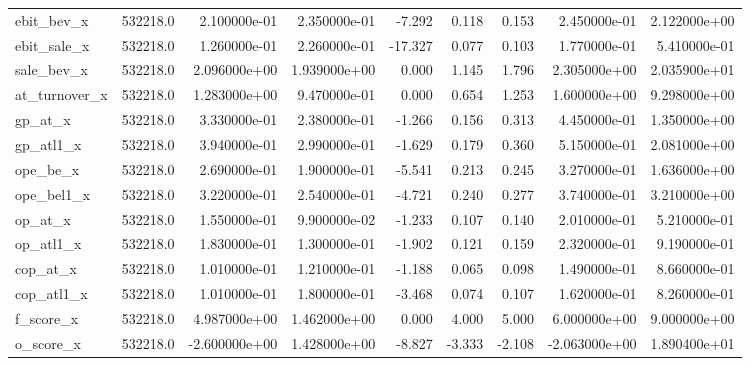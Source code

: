 \documentclass[12pt]{article}
\begin{document}
{\begin{landscape}
\begin{longtable}{|l|r|r|r|r|r|r|r|r|}
ebit\_bev\_x             &  532218.0 &  2.100000e-01 &  2.350000e-01 &      -7.292 &        0.118 &        0.153 &  2.450000e-01 &  2.122000e+00 \\
ebit\_sale\_x            &  532218.0 &  1.260000e-01 &  2.260000e-01 &     -17.327 &        0.077 &        0.103 &  1.770000e-01 &  5.410000e-01 \\
sale\_bev\_x             &  532218.0 &  2.096000e+00 &  1.939000e+00 &       0.000 &        1.145 &        1.796 &  2.305000e+00 &  2.035900e+01 \\
at\_turnover\_x          &  532218.0 &  1.283000e+00 &  9.470000e-01 &       0.000 &        0.654 &        1.253 &  1.600000e+00 &  9.298000e+00 \\
gp\_at\_x                &  532218.0 &  3.330000e-01 &  2.380000e-01 &      -1.266 &        0.156 &        0.313 &  4.450000e-01 &  1.350000e+00 \\
gp\_atl1\_x              &  532218.0 &  3.940000e-01 &  2.990000e-01 &      -1.629 &        0.179 &        0.360 &  5.150000e-01 &  2.081000e+00 \\
ope\_be\_x               &  532218.0 &  2.690000e-01 &  1.900000e-01 &      -5.541 &        0.213 &        0.245 &  3.270000e-01 &  1.636000e+00 \\
ope\_bel1\_x             &  532218.0 &  3.220000e-01 &  2.540000e-01 &      -4.721 &        0.240 &        0.277 &  3.740000e-01 &  3.210000e+00 \\
op\_at\_x                &  532218.0 &  1.550000e-01 &  9.900000e-02 &      -1.233 &        0.107 &        0.140 &  2.010000e-01 &  5.210000e-01 \\
op\_atl1\_x              &  532218.0 &  1.830000e-01 &  1.300000e-01 &      -1.902 &        0.121 &        0.159 &  2.320000e-01 &  9.190000e-01 \\
cop\_at\_x               &  532218.0 &  1.010000e-01 &  1.210000e-01 &      -1.188 &        0.065 &        0.098 &  1.490000e-01 &  8.660000e-01 \\
cop\_atl1\_x             &  532218.0 &  1.010000e-01 &  1.800000e-01 &      -3.468 &        0.074 &        0.107 &  1.620000e-01 &  8.260000e-01 \\
f\_score\_x              &  532218.0 &  4.987000e+00 &  1.462000e+00 &       0.000 &        4.000 &        5.000 &  6.000000e+00 &  9.000000e+00 \\
o\_score\_x              &  532218.0 & -2.600000e+00 &  1.428000e+00 &      -8.827 &       -3.333 &       -2.108 & -2.063000e+00 &  1.890400e+01 \\

\end{longtable}
\end{landscape}}
\end{document}
